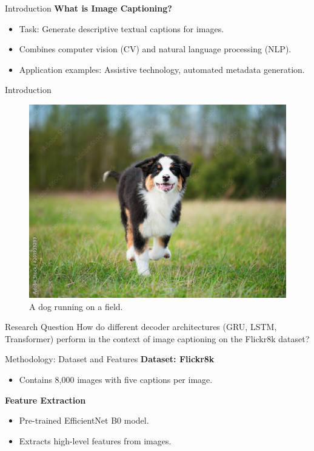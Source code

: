 \documentclass[10pt]{beamer}
\institute{Universit\"at Hamburg\\\trinstitute}
\title{\trtitle}
\subtitle{\trtype}
\author{\trauthor}
\date{}
\theoremstyle{remark}
\begin{document}
\renewcommand{\arraystretch}{1.2}

\begin{frame}[plain]
	\titlepage
\end{frame}


\begin{frame}{Introduction}
	\textbf{What is Image Captioning?}
	\begin{itemize}
		\item Task: Generate descriptive textual captions for images.
		\item Combines computer vision (CV) and natural language processing (NLP).
		\item Application examples: Assistive technology, automated metadata generation.
	\end{itemize}
\end{frame}

\begin{frame}{Introduction}
	\begin{figure}[H]
		\includegraphics[width=.6\textwidth]{res/dog.jpg}
		\caption{A dog running on a field.}\label{fig:dog}
	\end{figure}
\end{frame}

\begin{frame}{Research Question}
	How do different decoder architectures (GRU, LSTM, Transformer) perform in the context of image captioning on the Flickr8k dataset?
\end{frame}

\begin{frame}{Methodology: Dataset and Features}
	\textbf{Dataset: Flickr8k}
	\begin{itemize}
		\item Contains 8,000 images with five captions per image.
	\end{itemize}
	\textbf{Feature Extraction}
	\begin{itemize}
		\item Pre-trained EfficientNet B0 model.
		\item Extracts high-level features from images.
	\end{itemize}
\end{frame}
\end{document}
